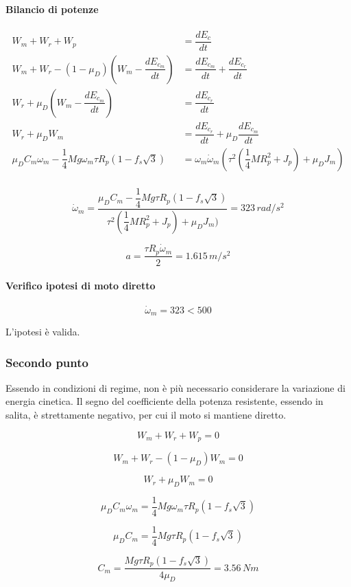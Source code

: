 \documentclass[main.tex]{subfiles}
\begin{document}
\paragraph{Bilancio di potenze}

\begin{align*}
	W_m + W_r + W_p &= \dfrac{dE_c}{dt}\\
	W_m + W_r - (1-\mu_D)(W_m - \dfrac{dE_{c_m}}{dt}) &= \dfrac{dE_{c_m}}{dt} + \dfrac{dE_{c_r}}{dt}\\
	W_r + \mu_D(W_m - \dfrac{dE_{c_m}}{dt}) &= \dfrac{dE_{c_r}}{dt}\\
	W_r + \mu_DW_m &= \dfrac{dE_{c_r}}{dt} + \mu_D\dfrac{dE_{c_m}}{dt}\\
	\mu_DC_m\omega_m -\dfrac{1}{4}Mg\omega_m \tau R_p(1-f_s\sqrt{3}) &=  \omega_m\dot{\omega}_m(\tau^2(\dfrac{1}{4}M R_p^2 + J_p) +  \mu_DJ_m)\\
\end{align*}

\[
\dot{\omega}_m = \dfrac{\mu_DC_m -\dfrac{1}{4}Mg\tau R_p(1-f_s\sqrt{3})}{\tau^2(\dfrac{1}{4}M R_p^2 + J_p) +  \mu_DJ_m)} = 323\,rad/s^2
\]

\[
	a = \dfrac{\tau R_p \dot{\omega}_m}{2} = 1.615\,m/s^2
\]

\paragraph{Verifico ipotesi di moto diretto}

\[
	\dot{\omega}_m = 323 < 500
\]

L'ipotesi è valida.

\subsubsection{Secondo punto}
Essendo in condizioni di regime, non è più necessario considerare la variazione di energia cinetica. Il segno del coefficiente della potenza resistente, essendo in salita, è strettamente negativo, per cui il moto si mantiene diretto.

\[
	W_m + W_r + W_p = 0
\]

\[
	W_m + W_r - (1-\mu_D)W_m = 0
\]

\[
	W_r + \mu_DW_m = 0
\]

\[
	\mu_DC_m\omega_m = \dfrac{1}{4}Mg\omega_m \tau R_p(1-f_s\sqrt{3})
\]

\[
	\mu_DC_m = \dfrac{1}{4}Mg \tau R_p(1-f_s\sqrt{3})
\]

\[
	C_m = \dfrac{Mg \tau R_p(1-f_s\sqrt{3})}{4\mu_D} = 3.56\,Nm
\]
\end{document}
